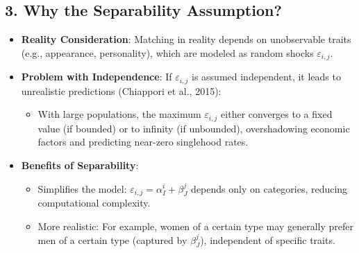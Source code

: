 \subsection*{3. Why the Separability Assumption?}
\begin{itemize}
    \item \textbf{Reality Consideration}: Matching in reality depends on unobservable traits (e.g., appearance, personality), which are modeled as random shocks \( \varepsilon_{i,j} \).
    \item \textbf{Problem with Independence}: If \( \varepsilon_{i,j} \) is assumed independent, it leads to unrealistic predictions (Chiappori et al., 2015):
    \begin{itemize}
        \item With large populations, the maximum \( \varepsilon_{i,j} \) either converges to a fixed value (if bounded) or to infinity (if unbounded), overshadowing economic factors and predicting near-zero singlehood rates.
    \end{itemize}
    \item \textbf{Benefits of Separability}:
    \begin{itemize}
        \item Simplifies the model: \( \varepsilon_{i,j} = \alpha_I^i + \beta_J^j \) depends only on categories, reducing computational complexity.
        \item More realistic: For example, women of a certain type may generally prefer men of a certain type (captured by \( \beta_J^j \)), independent of specific traits.
    \end{itemize}
\end{itemize}

